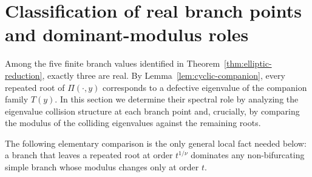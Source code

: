 \section{Classification of real branch points and dominant-modulus roles}\label{sec:ep-classification}

Among the five finite branch values identified in Theorem~\ref{thm:elliptic-reduction}, exactly three are real.
By Lemma~\ref{lem:cyclic-companion}, every repeated root of \(\Pi(\cdot,y)\) corresponds to a defective eigenvalue of the companion family \(T(y)\).
In this section we determine their spectral role by analyzing the eigenvalue collision structure at each branch point and, crucially, by comparing the modulus of the colliding eigenvalues against the remaining roots.

The following elementary comparison is the only general local fact needed below:
a branch that leaves a repeated root at order \(t^{1/\nu}\) dominates any non-bifurcating simple branch whose modulus changes only at order \(t\).

